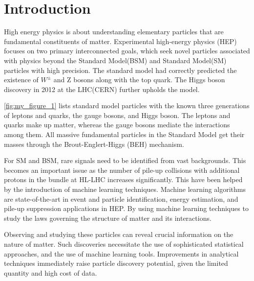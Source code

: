 \chapter{\label{intro}Introduction}

High energy physics is about understanding elementary particles that are fundamental constituents of matter.  Experimental high-energy physics (HEP) focuses on two primary interconnected goals, which seek novel particles associated with physics beyond the Standard Model(BSM) and Standard Model(SM) particles with high precision\cite{Salam:1964ry}\cite{GLASHOW1961579}. The standard model had correctly predicted the existence of $W^\pm$ and Z bosons along with the top quark\cite{PhysRevLett.19.1264}\cite{10.1143/PTP.49.634}. The Higgs boson discovery in 2012 at the LHC(CERN) further upholds the model\cite{Aad_2015}\cite{Aad_2014}.

\autoref{fig:my_figure_1} lists standard model particles with the known three generations of leptons and quarks, the gauge bosons, and Higgs boson. The leptons and quarks make up matter, whereas the gauge bosons mediate the interactions among them\cite{PhysRevLett.13.321}. All massive fundamental particles in the Standard Model get their masses through the Brout-Englert-Higgs (BEH) mechanism\cite{Higgs:1964pj}.

For SM and BSM, rare signals need to be identified from vast backgrounds. This becomes an important issue as the number of pile-up collisions with additional protons in the bundle at  HL-LHC increases significantly\cite{https://doi.org/10.48550/arxiv.1807.02876}. This have been helped by the introduction of machine learning techniques. Machine learning algorithms are state-of-the-art in event and particle identification, energy estimation, and pile-up suppression applications in HEP. By using machine learning techniques to study the laws governing the structure of matter and  its interactions\cite{Baldi2014}.

Observing and studying these particles can reveal crucial information on the nature of matter\cite{Higgs_snowmass}. Such discoveries necessitate the use of sophisticated statistical approaches, and the use of machine learning tools. Improvements in analytical techniques immediately raise particle discovery potential, given the limited quantity and high cost of data.



    
